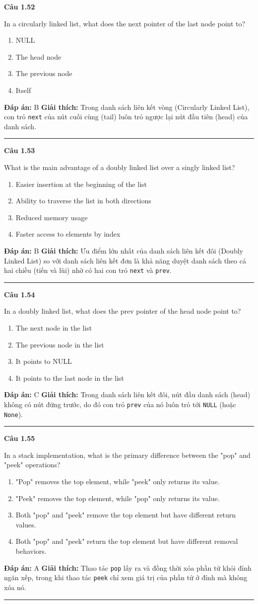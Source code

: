 \documentclass[11pt,a4paper]{article}
\newenvironment{question}[1]{%
  \par\vspace{1em}\noindent\textbf{\large Câu #1}\par\vspace{0.4em}
}{%
  \par\vspace{1em}\hrule\vspace{0.6em}
}
\newenvironment{choices}{%
  \begin{enumerate}[label=\textbf{\Alph*.},leftmargin=2.2em,itemsep=2pt,topsep=3pt]
}{%
  \end{enumerate}
}
\newcommand{\choice}{\item}
\begin{document}
\begin{question}{1.52}
In a circularly linked list, what does the next pointer of the last node point to?
\begin{choices}
\choice NULL
\choice The head node
\choice The previous node
\choice Itself
\end{choices}
\textbf{Đáp án:} B
\textbf{Giải thích:} Trong danh sách liên kết vòng (Circularly Linked List), con trỏ \texttt{next} của nút cuối cùng (tail) luôn trỏ ngược lại nút đầu tiên (head) của danh sách.
\end{question}

\begin{question}{1.53}
What is the main advantage of a doubly linked list over a singly linked list?
\begin{choices}
\choice Easier insertion at the beginning of the list
\choice Ability to traverse the list in both directions
\choice Reduced memory usage
\choice Faster access to elements by index
\end{choices}
\textbf{Đáp án:} B
\textbf{Giải thích:} Ưu điểm lớn nhất của danh sách liên kết đôi (Doubly Linked List) so với danh sách liên kết đơn là khả năng duyệt danh sách theo cả hai chiều (tiến và lùi) nhờ có hai con trỏ \texttt{next} và \texttt{prev}.
\end{question}

\begin{question}{1.54}
In a doubly linked list, what does the prev pointer of the head node point to?
\begin{choices}
\choice The next node in the list
\choice The previous node in the list
\choice It points to NULL
\choice It points to the last node in the list
\end{choices}
\textbf{Đáp án:} C
\textbf{Giải thích:} Trong danh sách liên kết đôi, nút đầu danh sách (head) không có nút đứng trước, do đó con trỏ \texttt{prev} của nó luôn trỏ tới \texttt{NULL} (hoặc \texttt{None}).
\end{question}

\begin{question}{1.55}
In a stack implementation, what is the primary difference between the "pop" and "peek" operations?
\begin{choices}
\choice "Pop" removes the top element, while "peek" only returns its value.
\choice "Peek" removes the top element, while "pop" only returns its value.
\choice Both "pop" and "peek" remove the top element but have different return values.
\choice Both "pop" and "peek" return the top element but have different removal behaviors.
\end{choices}
\textbf{Đáp án:} A
\textbf{Giải thích:} Thao tác \texttt{pop} lấy ra và đồng thời xóa phần tử khỏi đỉnh ngăn xếp, trong khi thao tác \texttt{peek} chỉ xem giá trị của phần tử ở đỉnh mà không xóa nó.
\end{question}
\end{document}
